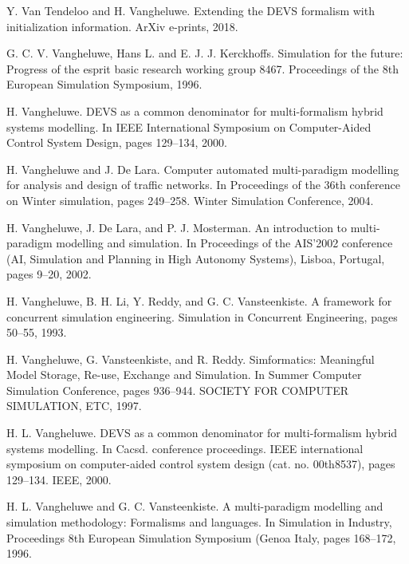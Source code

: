\begin{description}[style=nextline,leftmargin=12mm,labelwidth=10mm,font=\normalfont]
\item[{[285]}] Y. Van Tendeloo and H. Vangheluwe. Extending the DEVS formalism with initialization information. ArXiv e-prints, 2018.

\item[{[286]}] G. C. V. Vangheluwe, Hans L. and E. J. J. Kerckhoffs. Simulation for the future: Progress of the esprit basic research working group 8467. Proceedings of the 8th European Simulation Symposium, 1996.

\item[{[287]}] H. Vangheluwe. DEVS as a common denominator for multi-formalism hybrid systems modelling. In IEEE International Symposium on Computer-Aided Control System Design, pages 129–134, 2000.

\item[{[288]}] H. Vangheluwe and J. De Lara. Computer automated multi-paradigm modelling for analysis and design of traffic networks. In Proceedings of the 36th conference on Winter simulation, pages 249–258. Winter Simulation Conference, 2004.

\item[{[289]}] H. Vangheluwe, J. De Lara, and P. J. Mosterman. An introduction to multi-paradigm modelling and simulation. In Proceedings of the AIS’2002 conference (AI, Simulation and Planning in High Autonomy Systems), Lisboa, Portugal, pages 9–20, 2002.

\item[{[290]}] H. Vangheluwe, B. H. Li, Y. Reddy, and G. C. Vansteenkiste. A framework for concurrent simulation engineering. Simulation in Concurrent Engineering, pages 50–55, 1993.

\item[{[291]}] H. Vangheluwe, G. Vansteenkiste, and R. Reddy. Simformatics: Meaningful Model Storage, Re-use, Exchange and Simulation. In Summer Computer Simulation Conference, pages 936–944. SOCIETY FOR COMPUTER SIMULATION, ETC, 1997.

\item[{[292]}] H. L. Vangheluwe. DEVS as a common denominator for multi-formalism hybrid systems modelling. In Cacsd. conference proceedings. IEEE international symposium on computer-aided control system design (cat. no. 00th8537), pages 129–134. IEEE, 2000.

\item[{[293]}] H. L. Vangheluwe and G. C. Vansteenkiste. A multi-paradigm modelling and simulation methodology: Formalisms and languages. In Simulation in Industry, Proceedings 8th European Simulation Symposium (Genoa Italy, pages 168–172, 1996.


\end{description}
